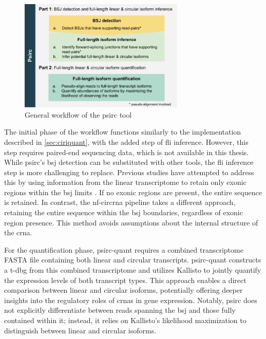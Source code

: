 \begin{figure}[ht] \centering

    \includegraphics[width=0.7\textwidth]{chapters/3_materials_and_methods/figures/psirc_pipeline.png}
    \caption{General workflow of the \gls{psirc} tool}
    \label{fig:psirc_workflow} \end{figure}

The initial phase of the workflow functions similarly to the implementation
described in \cref{sec:ciriquant}, with the added step of \gls{fli} inference.
However, this step requires paired-end sequencing data, which is not available
in this thesis.
While \gls{psirc}'s \gls{bsj} detection can be substituted with other tools,
the \gls{fli} inference step is more challenging to replace.
Previous studies have attempted to address this by using information from the
linear transcriptome to retain only exonic regions within the \gls{bsj} limits
\supercite{hoffmann_circrna-sponging_2023}.
If no exonic regions are present, the entire sequence is retained.
In contrast, the \gls{nf-circrna} pipeline takes a different approach,
retaining the entire sequence within the \gls{bsj} boundaries, regardless of
exonic region presence.
This method avoids assumptions about the internal structure of the \gls{crna}.

For the quantification phase, \gls{psirc-quant} requires a combined
transcriptome FASTA file containing both linear and circular transcripts.
\Gls{psirc-quant} constructs a \gls{t-dbg} from this combined
transcriptome and utilizes Kallisto to jointly quantify the expression levels
of both transcript types\supercite{yu_quantifying_2021}.
This approach enables a direct comparison between linear and circular isoforms,
potentially offering deeper insights into the regulatory roles of \glspl{crna}
in gene expression.
Notably, \gls{psirc} does not explicitly differentiate between reads spanning
the \gls{bsj} and those fully contained within it; instead, it relies on
Kallisto's likelihood maximization to distinguish between linear and circular
isoforms\supercite{yu_quantifying_2021}.
